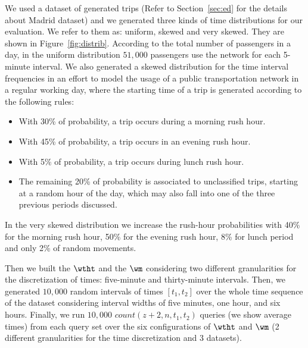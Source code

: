 We used a dataset of generated trips  (Refer to Section~\ref{sec:ed} for the details about Madrid dataset) and we
generated three kinds of time distributions for our evaluation. We refer to them as: uniform, skewed and very skewed. They are shown
in Figure~\ref{fig:distrib}. 
According to the total number of passengers in a day, in the uniform distribution $51,\!000$ passengers 
use the network for each 5-minute interval. 
We also generated a skewed distribution for the time interval frequencies in an effort to
model the usage of a public transportation network in a regular working day, where the starting time of a trip
is generated according to the following rules:
%
\begin{itemize}
	\item With 30\% of probability, a trip occurs during a morning rush hour.
	\item With 45\% of probability, a trip occurs in an evening rush hour.
	\item With 5\% of probability, a trip occurs during lunch rush hour.
	\item The remaining 20\% of probability is associated to unclassified trips, starting at a random hour of the day, which may
	also fall into one of the three previous periods discussed.
\end{itemize}
%
In the very skewed distribution we increase the rush-hour probabilities with
40\% for the morning rush hour, 50\% for the evening rush hour, 8\% for lunch period and only
2\% of random movements.
\medskip

Then we built the $\wtht$ and the $\wm$ considering two different granularities for the discretization of times: 
five-minute and thirty-minute intervals. Then, we generated $10,\!000$ random intervals of times $[t_1,t_2]$ over the whole 
time sequence of the dataset considering interval widths of five minutes, one hour, and six hours.  
Finally, we run $10,\!000$  $count(z+2,n,t_1,t_2)$ queries (we show average times) from each query set over 
the six configurations of $\wtht$ and $\wm$  
(2 different granularities for the time discretization and 3 datasets).







